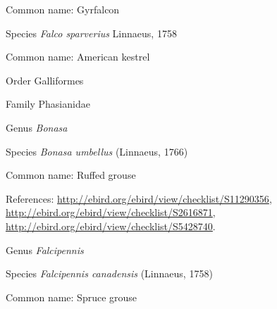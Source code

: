 \documentclass[9pt, article]{memoir}
\begin{document}
\begin{multicols}{2}
Common name: Gyrfalcon

\vspace{6pt}\noindent\hspace{36pt}Species \textit{Falco sparverius} Linnaeus, 1758


Common name: American kestrel

\vspace{6pt}\noindent\hspace{18pt}Order Galliformes


\vspace{6pt}\noindent\hspace{24pt}Family Phasianidae


\vspace{6pt}\noindent\hspace{30pt}Genus \textit{Bonasa}


\vspace{6pt}\noindent\hspace{36pt}Species \textit{Bonasa umbellus} (Linnaeus, 1766)


Common name: Ruffed grouse

References: 
\url{http://ebird.org/ebird/view/checklist/S11290356}, 
\url{http://ebird.org/ebird/view/checklist/S2616871}, 
\url{http://ebird.org/ebird/view/checklist/S5428740}.

\vspace{6pt}\noindent\hspace{30pt}Genus \textit{Falcipennis}


\vspace{6pt}\noindent\hspace{36pt}Species \textit{Falcipennis canadensis} (Linnaeus, 1758)


Common name: Spruce grouse


\end{multicols}
\end{document}
